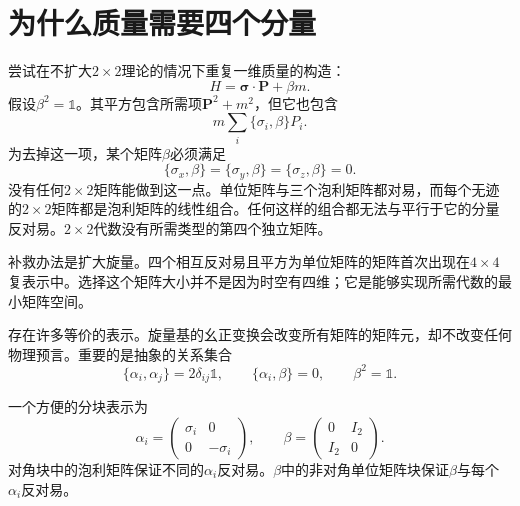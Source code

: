 \section{为什么质量需要四个分量}

尝试在不扩大\(2\times2\)理论的情况下重复一维质量的构造：
\begin{equation}
H=\boldsymbol{\sigma}\cdot\mathbf P+\beta m.
\label{eq:l10-failed-mass}
\end{equation}
假设\(\beta^2=\mathbb{1}\)。其平方包含所需项\(\mathbf P^2+m^2\)，但它也包含
\begin{equation}
m\sum_i\{\sigma_i,\beta\}P_i.
\end{equation}
为去掉这一项，某个矩阵\(\beta\)必须满足
\begin{equation}
\{\sigma_x,\beta\}
=
\{\sigma_y,\beta\}
=
\{\sigma_z,\beta\}
=0.
\label{eq:l10-impossible-beta}
\end{equation}
没有任何\(2\times2\)矩阵能做到这一点。单位矩阵与三个泡利矩阵都对易，而每个无迹的\(2\times2\)矩阵都是泡利矩阵的线性组合。任何这样的组合都无法与平行于它的分量反对易。\(2\times2\)代数没有所需类型的第四个独立矩阵。

补救办法是扩大旋量。四个相互反对易且平方为单位矩阵的矩阵首次出现在\(4\times4\)复表示中。选择这个矩阵大小并不是因为时空有四维；它是能够实现所需代数的最小矩阵空间。

存在许多等价的表示。旋量基的幺正变换会改变所有矩阵的矩阵元，却不改变任何物理预言。重要的是抽象的关系集合
\begin{equation}
\{\alpha_i,\alpha_j\}=2\delta_{ij}\mathbb{1},
\qquad
\{\alpha_i,\beta\}=0,
\qquad
\beta^2=\mathbb{1}.
\label{eq:l10-dirac-algebra}
\end{equation}

\begin{classroomqa}
\end{classroomqa}

一个方便的分块表示为
\begin{equation}
\alpha_i=
\begin{pmatrix}
\sigma_i&0\\
0&-\sigma_i
\end{pmatrix},
\qquad
\beta=
\begin{pmatrix}
0&I_2\\
I_2&0
\end{pmatrix}.
\label{eq:l10-block-representation}
\end{equation}
对角块中的泡利矩阵保证不同的\(\alpha_i\)反对易。\(\beta\)中的非对角单位矩阵块保证\(\beta\)与每个\(\alpha_i\)反对易。

